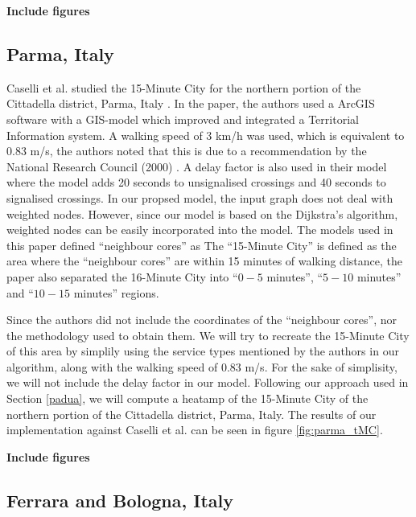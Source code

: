 \textbf{Include figures}

\subsection{Parma, Italy}

Caselli et al. studied the 15-Minute City for the northern portion of the Cittadella district, Parma, Italy \cite{caselli_exploring_2022}. In the paper, the authors used a ArcGIS software with a GIS-model which improved and integrated a Territorial Information system. A walking speed of 3 km/h was used, which is equivalent to 0.83 m/s, the authors noted that this is due to a recommendation by the National Research Council (2000) . A delay factor is also used in their model where the model adds 20 seconds to unsignalised crossings and 40 seconds to signalised crossings. In our propsed model, the input graph does not deal with weighted nodes. However, since our model is based on the Dijkstra's algorithm, weighted nodes can be easily incorporated into the model. The models used in this paper defined ``neighbour cores'' as  The ``15-Minute City'' is defined as the area where the ``neighbour cores'' are within 15 minutes of walking distance, the paper also separated the 16-Minute City into ``$0 - 5$ minutes'', ``$5 - 10$ minutes'' and ``$10 - 15$ minutes'' regions.

Since the authors did not include the coordinates of the ``neighbour cores'', nor the methodology used to obtain them. We will try to recreate the 15-Minute City of this area by simplily using the service types mentioned by the authors in our algorithm, along with the walking speed of 0.83 m/s. For the sake of simplisity, we will not include the delay factor in our model. Following our approach used in Section \ref{padua}, we will compute a heatamp of the 15-Minute City of the northern portion of the Cittadella district, Parma, Italy. The results of our implementation against Caselli et al. can be seen in figure \ref{fig:parma_tMC}.

\textbf{Include figures}

\subsection{Ferrara and Bologna, Italy}

